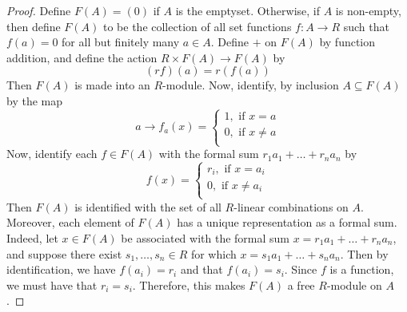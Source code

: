 \begin{proof}
  Define $F(A)=(0)$ if $A$ is the emptyset. Otherwise, if $A$ is
  non-empty, then define $F(A)$ to be the collection of all set
  functions $f:A \xrightarrow{} R$ such that $f(a)=0$ for all but
  finitely many $a \in A$. Define $+$ on $F(A)$ by function addition,
  and define the action $R \times F(A) \xrightarrow{} F(A)$ by
  \begin{equation*}
    (rf)(a)=r(f(a))
  \end{equation*}
  Then $F(A)$ is made into an $R$-module. Now, identify, by inclusion
  $A \subseteq F(A)$ by the map
  \begin{equation*}
    a \xrightarrow{} f_a(x)=
    \begin{cases}
      1, \text{ if } x=a  \\
      0, \text{ if } x \neq a \\
    \end{cases}
  \end{equation*}
  Now, identify each $f \in F(A)$ with the formal sum
  $r_1a_1+\dots+r_na_n$ by
  \begin{equation*}
    f(x)=
    \begin{cases}
      r_i, \text{ if } x=a_i  \\
      0 , \text{ if } x \neq a_i  \\
    \end{cases}
  \end{equation*}
  Then $F(A)$ is identified with the set of all $R$-linear
  combinations on $A$. Moreover, each element of $F(A)$ has a unique
  representation as a formal sum. Indeed, let $x \in F(A)$ be
  associated with the formal sum $x=r_1a_1+\dots+r_na_n$, and suppose
  there exist $s_1, \dots, s_n \in R$ for which
  $x=s_1a_1+\dots+s_na_n$. Then by identification, we have
  $f(a_i)=r_i$ and that $f(a_i)=s_i$. Since $f$ is a function, we must
  have that $r_i=s_i$. Therefore, this makes $F(A)$ a free $R$-module
  on  $A$.


\end{proof}

